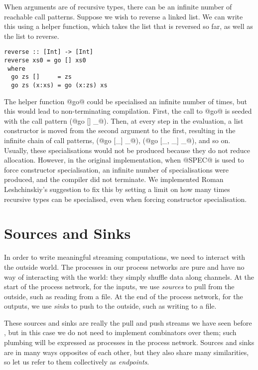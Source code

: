 When arguments are of recursive types, there can be an infinite number of reachable call patterns.
Suppose we wish to reverse a linked list.
We can write this using a helper function, which takes the list that is reversed so far, as well as the list to reverse.

\begin{lstlisting}
reverse :: [Int] -> [Int]
reverse xs0 = go [] xs0
 where
  go zs []     = zs
  go zs (x:xs) = go (x:zs) xs
\end{lstlisting}

The helper function @go@ could be specialised an infinite number of times, but this would lead to non-terminating compilation.
First, the call to @go@ is seeded with the call pattern (@go [] _@).
Then, at every step in the evaluation, a list constructor is moved from the second argument to the first, resulting in the infinite chain of call patterns, (@go [_] _@), (@go [_, _] _@), and so on.
Usually, these specialisations would not be produced because they do not reduce allocation.
However, in the original implementation, when @SPEC@ is used to force constructor specialisation, an infinite number of specialisations were produced, and the compiler did not terminate.
We implemented Roman Leshchinskiy's suggestion to fix this by setting a limit on how many times recursive types can be specialised, even when forcing constructor specialisation.

\section{Sources and Sinks}
In order to write meaningful streaming computations, we need to interact with the outside world.
The processes in our process networks are pure and have no way of interacting with the world: they simply shuffle data along channels.
At the start of the process network, for the inputs, we use \emph{sources} to pull from the outside, such as reading from a file.
At the end of the process network, for the outputs, we use \emph{sinks} to push to the outside, such as writing to a file.

These sources and sinks are really the pull and push streams we have seen before , but in this case we do not need to implement combinators over them; such plumbing will be expressed as processes in the process network.
Sources and sinks are in many ways opposites of each other, but they also share many similarities, so let us refer to them collectively as \emph{endpoints}.


